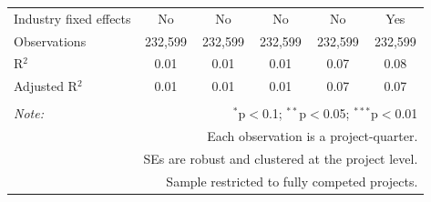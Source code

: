 \documentclass[
]{article}
\begin{document}
\begin{table}[H]
\begin{tabular}{@{\extracolsep{-2pt}}lccccc}
Industry fixed effects & No & No & No & No & Yes \\ 
Observations & 232,599 & 232,599 & 232,599 & 232,599 & 232,599 \\ 
R$^{2}$ & 0.01 & 0.01 & 0.01 & 0.07 & 0.08 \\ 
Adjusted R$^{2}$ & 0.01 & 0.01 & 0.01 & 0.07 & 0.07 \\ 
\hline 
\hline \\[-1.8ex] 
\textit{Note:}  & \multicolumn{5}{r}{$^{*}$p$<$0.1; $^{**}$p$<$0.05; $^{***}$p$<$0.01} \\ 
 & \multicolumn{5}{r}{Each observation is a project-quarter.} \\ 
 & \multicolumn{5}{r}{SEs are robust and clustered at the project level.} \\ 
 & \multicolumn{5}{r}{Sample restricted to fully competed projects.} \\ 
\end{tabular} 
\end{table}
\end{document}

